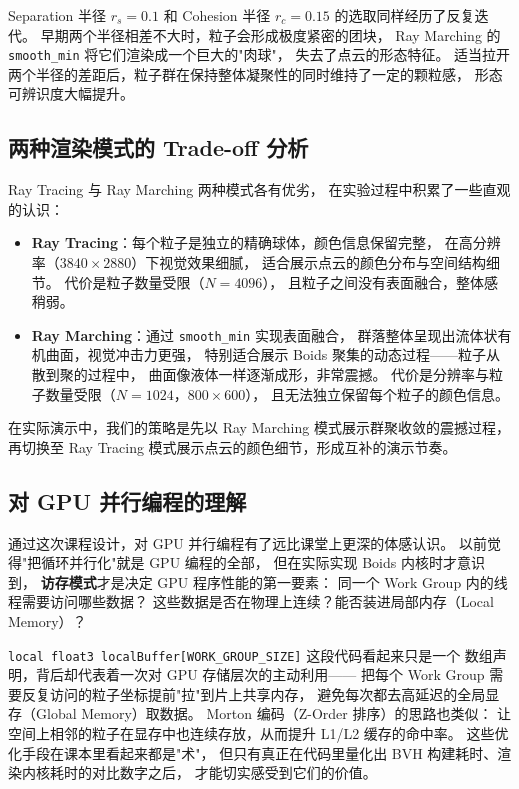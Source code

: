Separation 半径 $r_s=0.1$ 和 Cohesion 半径 $r_c=0.15$ 的选取同样经历了反复迭代。
早期两个半径相差不大时，粒子会形成极度紧密的团块，
Ray Marching 的 \texttt{smooth\_min} 将它们渲染成一个巨大的"肉球"，
失去了点云的形态特征。
适当拉开两个半径的差距后，粒子群在保持整体凝聚性的同时维持了一定的颗粒感，
形态可辨识度大幅提升。

\subsection{两种渲染模式的 Trade-off 分析}

Ray Tracing 与 Ray Marching 两种模式各有优劣，
在实验过程中积累了一些直观的认识：

\begin{itemize}
  \item \textbf{Ray Tracing}：每个粒子是独立的精确球体，颜色信息保留完整，
        在高分辨率（$3840\times2880$）下视觉效果细腻，
        适合展示点云的颜色分布与空间结构细节。
        代价是粒子数量受限（$N=4096$），
        且粒子之间没有表面融合，整体感稍弱。
  \item \textbf{Ray Marching}：通过 \texttt{smooth\_min} 实现表面融合，
        群落整体呈现出流体状有机曲面，视觉冲击力更强，
        特别适合展示 Boids 聚集的动态过程——粒子从散到聚的过程中，
        曲面像液体一样逐渐成形，非常震撼。
        代价是分辨率与粒子数量受限（$N=1024$，$800\times600$），
        且无法独立保留每个粒子的颜色信息。
\end{itemize}

在实际演示中，我们的策略是先以 Ray Marching 模式展示群聚收敛的震撼过程，
再切换至 Ray Tracing 模式展示点云的颜色细节，形成互补的演示节奏。

\subsection{对 GPU 并行编程的理解}

通过这次课程设计，对 GPU 并行编程有了远比课堂上更深的体感认识。
以前觉得"把循环并行化"就是 GPU 编程的全部，
但在实际实现 Boids 内核时才意识到，
\textbf{访存模式}才是决定 GPU 程序性能的第一要素：
同一个 Work Group 内的线程需要访问哪些数据？
这些数据是否在物理上连续？能否装进局部内存（Local Memory）？

\texttt{local float3 localBuffer[WORK\_GROUP\_SIZE]} 这段代码看起来只是一个
数组声明，背后却代表着一次对 GPU 存储层次的主动利用——
把每个 Work Group 需要反复访问的粒子坐标提前"拉"到片上共享内存，
避免每次都去高延迟的全局显存（Global Memory）取数据。
Morton 编码（Z-Order 排序）的思路也类似：
让空间上相邻的粒子在显存中也连续存放，从而提升 L1/L2 缓存的命中率。
这些优化手段在课本里看起来都是"术"，
但只有真正在代码里量化出 BVH 构建耗时、渲染内核耗时的对比数字之后，
才能切实感受到它们的价值。

